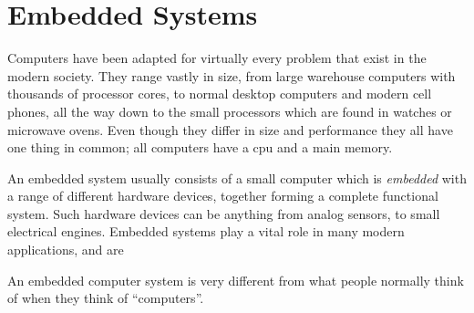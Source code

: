 
\section{Embedded Systems}
\label{sec:embedded_systems}

Computers have been adapted for virtually every problem that exist in the modern society.
They range vastly in size, from large warehouse computers with thousands of processor cores, to normal desktop computers and modern cell phones, all the way down to the small processors which are found in watches or microwave ovens.
Even though they differ in size and performance they all have one thing in common; all computers have a \gls{cpu} and a main memory.

An embedded system usually consists of a small computer which is \emph{embedded} with a range of different hardware devices, together forming a complete functional system.
Such hardware devices can be anything from analog sensors, to small electrical engines.
Embedded systems play a vital role in many modern applications, and are


An embedded computer system is very different from what people normally think of when they think of ``computers''.

